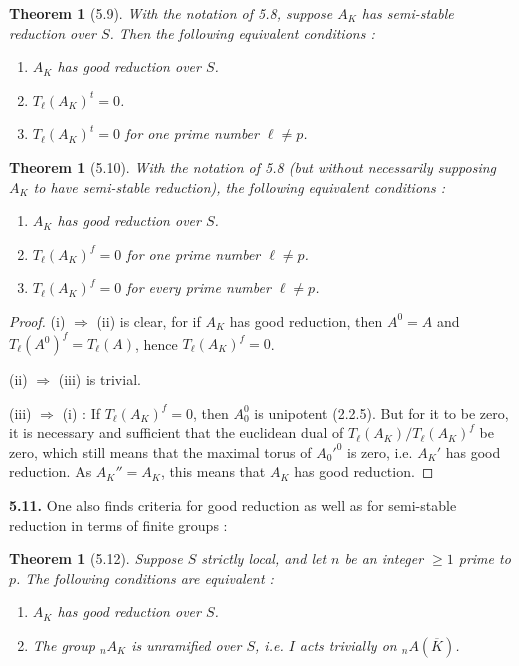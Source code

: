 \documentclass[11pt]{article}
\theoremstyle{plain}
\newtheorem{theoreme}[theorem]{Theorem}
\theoremstyle{definition}
\theoremstyle{remark}
\newcommand{\Tl}{T_\ell}
\begin{document}
\begin{theoreme}[5.9]
With the notation of \emph{5.8}, suppose $A_K$ has semi-stable
reduction over $S$. Then the following equivalent conditions :
\begin{enumerate}[label=\emph{(\roman*)}]
\item $A_K$ has \emph{good reduction} over $S$.
\item $\Tl(A_K)^t = 0$.
\item $\Tl(A_K)^t = 0$ for \emph{one} prime number $\ell \neq p$.
\end{enumerate}
\end{theoreme}

\begin{theoreme}[5.10]
With the notation of \emph{5.8} (but without necessarily supposing $A_K$
to have semi-stable reduction), the following equivalent conditions :
\begin{enumerate}[label=\emph{(\roman*)}]
\item $A_K$ has \emph{good reduction} over $S$.
\item $\Tl(A_K)^f = 0$ for \emph{one} prime number $\ell \neq p$.
\item $\Tl(A_K)^f = 0$ for \emph{every} prime number $\ell \neq p$.
\end{enumerate}
\end{theoreme}

\begin{proof}
(i) $\Rightarrow$ (ii) is clear, for if $A_K$ has good reduction, then
$A^0 = A$ and $\Tl(A^0)^f = \Tl(A)$, hence $\Tl(A_K)^f = 0$.

(ii) $\Rightarrow$ (iii) is trivial.

(iii) $\Rightarrow$ (i) : If $\Tl(A_K)^f = 0$, then $A_0^0$ is
unipotent (2.2.5). But for it to be zero, it is necessary and
sufficient that the euclidean dual of $\Tl(A_K)/\Tl(A_K)^f$ be zero,
which still means that the maximal torus of $A_0'^0$ is zero, i.e.
$A_K'$ has good reduction. As $A_K'' = A_K$, this means that $A_K$ has
good reduction.
\end{proof}

\medskip

\noindent\textbf{5.11.} One also finds criteria for good reduction as
well as for semi-stable reduction in terms of finite groups :

\begin{theoreme}[5.12]
Suppose $S$ strictly local, and let $n$ be an integer $\geq 1$ prime to
$p$. The following conditions are equivalent :
\begin{enumerate}[label=\emph{(\roman*)}]
\item $A_K$ has \emph{good reduction} over $S$.
\item The group ${}_n A_K$ is unramified over $S$, i.e. $I$ acts
trivially on ${}_n A(\overline{K})$.
\end{enumerate}
\end{theoreme}
\end{document}
